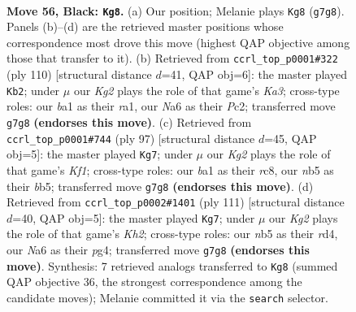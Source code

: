\documentclass[11pt]{article}
\begin{document}
\clearpage

\begin{figure}[p]\centering
\begin{subfigure}{0.46\textwidth}\centering
\resizebox{\linewidth}{!}{%
\newchessgame
\chessboard[
  setfen={8/4p1k1/npr4p/pN4p1/P1p5/2P2PK1/3R4/B7 b - - 1 56},
  showmover=false,
  pgfstyle=straightmove, color=movearrow, markmove={g7-g8}
]}
\caption{}
\end{subfigure}\hfill
\begin{subfigure}{0.46\textwidth}\centering
\resizebox{\linewidth}{!}{%
\newchessgame
\chessboard[
  setfen={8/p2k1p2/1p2p1p1/1P2P3/P3R2P/K7/2P4P/r7 w - - 9 56},
  showmover=false,
  pgfstyle=straightmove, color=movearrow, markmove={a3-b2}
]}
\caption{}
\end{subfigure}
\\[4pt]
\begin{subfigure}{0.46\textwidth}\centering
\resizebox{\linewidth}{!}{%
\newchessgame
\chessboard[
  setfen={2R2k2/r4p2/4p3/1B1p2p1/6Pp/7P/5PK1/8 b - - 23 49},
  showmover=false,
  pgfstyle=straightmove, color=movearrow, markmove={f8-g7}
]}
\caption{}
\end{subfigure}\hfill
\begin{subfigure}{0.46\textwidth}\centering
\resizebox{\linewidth}{!}{%
\newchessgame
\chessboard[
  setfen={8/5p1k/1p2r2p/6p1/P2Rp1P1/4P3/5PPK/8 b - - 16 56},
  showmover=false,
  pgfstyle=straightmove, color=movearrow, markmove={h7-g7}
]}
\caption{}
\end{subfigure}
\caption{\textbf{Move 56, Black: \texttt{Kg8}.} (a) Our position; Melanie plays \texttt{Kg8} (\texttt{g7g8}). Panels (b)--(d) are the retrieved master positions whose correspondence most drove this move (highest QAP objective among those that transfer to it). (b) Retrieved from \texttt{ccrl\_top\_p0001\#322} (ply 110) [structural distance $d$=41, QAP obj=6]: the master played \texttt{Kb2}; under $\mu$ our \emph{Kg2} plays the role of that game's \emph{Ka3}; cross-type roles: our \emph{b}a1 as their \emph{r}a1, our \emph{N}a6 as their \emph{P}c2; transferred move \texttt{g7g8} \textbf{(endorses this move)}. (c) Retrieved from \texttt{ccrl\_top\_p0001\#744} (ply 97) [structural distance $d$=45, QAP obj=5]: the master played \texttt{Kg7}; under $\mu$ our \emph{Kg2} plays the role of that game's \emph{Kf1}; cross-type roles: our \emph{b}a1 as their \emph{r}c8, our \emph{n}b5 as their \emph{b}b5; transferred move \texttt{g7g8} \textbf{(endorses this move)}. (d) Retrieved from \texttt{ccrl\_top\_p0002\#1401} (ply 111) [structural distance $d$=40, QAP obj=5]: the master played \texttt{Kg7}; under $\mu$ our \emph{Kg2} plays the role of that game's \emph{Kh2}; cross-type roles: our \emph{n}b5 as their \emph{r}d4, our \emph{N}a6 as their \emph{p}g4; transferred move \texttt{g7g8} \textbf{(endorses this move)}. Synthesis: 7 retrieved analogs transferred to \texttt{Kg8} (summed QAP objective 36, the strongest correspondence among the candidate moves); Melanie committed it via the \texttt{search} selector.}
\label{fig:thought-m111}
\end{figure}
\end{document}
